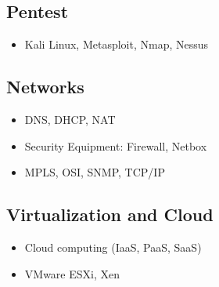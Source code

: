 \begin{multicols}{2}
\subsection*{Pentest}
\begin{itemize}
  \item Kali Linux, Metasploit, Nmap, Nessus
\end{itemize}

\subsection*{Networks}
\begin{itemize}
  \item DNS, DHCP, NAT
  \item Security Equipment: Firewall, Netbox
  \item MPLS, OSI, SNMP, TCP/IP
\end{itemize}

\subsection*{Virtualization and Cloud}
\begin{itemize}
  \item Cloud computing (IaaS, PaaS, SaaS)
  \item VMware ESXi, Xen
\end{itemize}

\end{multicols}